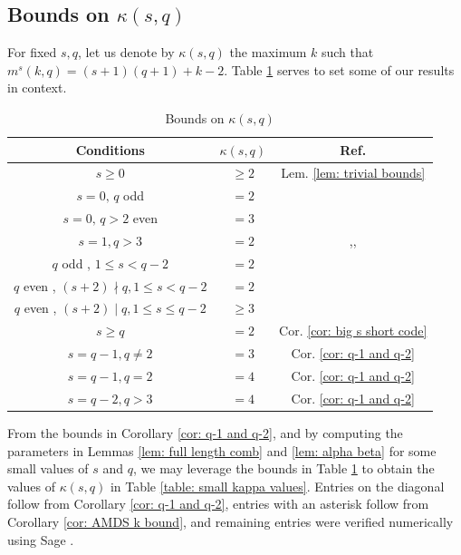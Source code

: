 \documentclass[11pt,a4paper]{amsart}
\theoremstyle{plain}
\theoremstyle{definition}
\theoremstyle{remark}
\begin{document}
	\subsection*{Bounds on $\kappa (s,q)$ }
	For fixed $s,q$, let us denote by $\kappa (s,q)$ the maximum $k$ such that $m^s(k,q)=(s+1)(q+1)+k-2$. Table \ref{table: summary of kappa values} serves to set some of our results in context.

	\begin{table}[h]
		\centering
		\caption{Bounds on  $\kappa (s,q)$}\label{table: summary of kappa values}%
		\begin{tabular}{|c|c|c|}
			\hline
			{ Conditions }	& $\kappa(s,q)$  &  { Ref.}  \\ \hline
			$s\ge 0$	& $\ge 2$ & { Lem. \ref{lem: trivial bounds} } \\  \hline
			$s= 0,\, q$  { odd }	& $= 2$ &\ {   \cite{Bose1947} }  \\  \hline
			$s= 0,\, q>2$ { even }	& $= 3$ & \ {  \cite{MR704102} } \\  \hline
			$s = 1, q>3$	& $= 2$ & {\cite{MR0083141},\cite{MR1466573}, \cite{MR0377682}} \\  \hline
			$q$  { odd }, $1\le s < q-2$	& $=2$ & { \cite{MR0083141} }\\  \hline
			$q$  { even }, $(s+2)\nmid q, 1\le s < q-2$	& $=2$ & { \cite{MR0083141} }\\  \hline
			$q$  { even }, $(s+2)\mid q, 1\le s \le q-2$	& $\ge 3$ &\ {  \cite{MR0239991} }\\  \hline
			$s \ge q$	& $=2$ &  {Cor. \ref{cor: big s short code}} \\  \hline
			$s=q-1, q\ne 2$	& $=3$ &   {Cor. \ref{cor: q-1 and q-2}} \\  \hline
			$s= q-1, q=2$	& $= 4$ &  {Cor. \ref{cor: q-1 and q-2}} \\ \hline
			$s=q-2, q>3$	& $=4$ &  {Cor. \ref{cor: q-1 and q-2}} \\ \hline
		\end{tabular}
	\end{table}

	From the bounds in Corollary \ref{cor: q-1 and q-2}, and by  computing the parameters in Lemmas \ref{lem: full length comb} and \ref{lem: alpha beta} for some small values of $s$ and $q$, we may leverage the bounds in Table \ref{table: summary of kappa values} to obtain the values of $\kappa(s,q)$ in Table \ref{table: small kappa values}. Entries on the diagonal follow from Corollary \ref{cor: q-1 and q-2}, entries with an asterisk follow from Corollary \ref{cor: AMDS k bound}, and remaining entries were verified numerically using Sage \cite{sage}.
\end{document}
